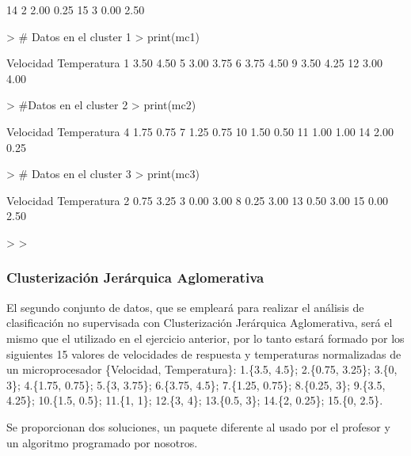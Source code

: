\documentclass[a4paper, 12pt]{article}
\begin{document}
\begin{itemize}
\begin{Schunk}
\begin{Soutput}
14                       2      2.00        0.25
15                       3      0.00        2.50
\end{Soutput}
\begin{Sinput}
> # Datos en el cluster 1
> print(mc1)
\end{Sinput}
\begin{Soutput}
   Velocidad Temperatura
1       3.50        4.50
5       3.00        3.75
6       3.75        4.50
9       3.50        4.25
12      3.00        4.00
\end{Soutput}
\begin{Sinput}
> #Datos en el cluster 2
> print(mc2)
\end{Sinput}
\begin{Soutput}
   Velocidad Temperatura
4       1.75        0.75
7       1.25        0.75
10      1.50        0.50
11      1.00        1.00
14      2.00        0.25
\end{Soutput}
\begin{Sinput}
> # Datos en el cluster 3
> print(mc3)
\end{Sinput}
\begin{Soutput}
   Velocidad Temperatura
2       0.75        3.25
3       0.00        3.00
8       0.25        3.00
13      0.50        3.00
15      0.00        2.50
\end{Soutput}
\begin{Sinput}
> 
> 
\end{Sinput}
\end{Schunk}
	\end{itemize}

	\newpage
	\subsubsection{Clusterización Jerárquica Aglomerativa}
	
	El segundo conjunto de datos, que se empleará para realizar el análisis de clasificación no supervisada con Clusterización Jerárquica Aglomerativa, será el mismo que el utilizado en el ejercicio anterior, por lo tanto estará formado por los siguientes 15 valores de velocidades de respuesta y temperaturas normalizadas de un microprocesador \{Velocidad, Temperatura\}: 1.\{3.5, 4.5\}; 2.\{0.75, 3.25\}; 3.\{0, 3\}; 4.\{1.75, 0.75\}; 5.\{3, 3.75\}; 6.\{3.75, 4.5\}; 7.\{1.25, 0.75\}; 8.\{0.25, 3\}; 9.\{3.5, 4.25\}; 10.\{1.5, 0.5\}; 11.\{1, 1\}; 12.\{3, 4\}; 13.\{0.5, 3\}; 14.\{2, 0.25\}; 15.\{0, 2.5\}.
	
	Se proporcionan dos soluciones, un paquete diferente al usado por el profesor y un algoritmo programado por nosotros.
	
\end{document}
